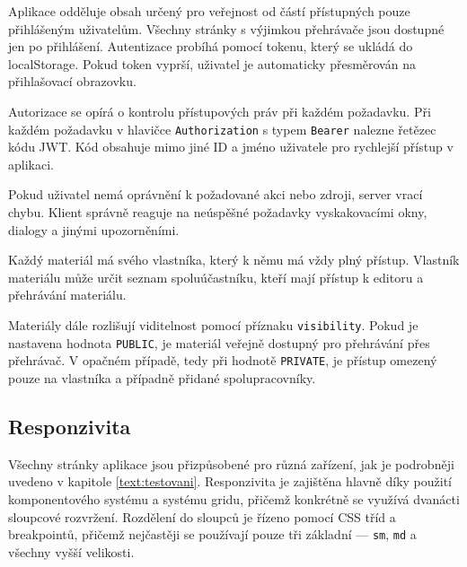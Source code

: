 Aplikace odděluje obsah určený pro veřejnost od částí přístupných pouze přihlášeným uživatelům. 
Všechny stránky s výjimkou přehrávače jsou dostupné jen po přihlášení. 
Autentizace probíhá pomocí tokenu, který se ukládá do localStorage. 
Pokud token vyprší, uživatel je automaticky přesměrován na přihlašovací obrazovku.

Autorizace se opírá o kontrolu přístupových práv při každém požadavku. 
Při každém požadavku v hlavičce \texttt{Authorization} s typem \texttt{Bearer} nalezne řetězec kódu JWT.
Kód obsahuje mimo jiné ID a jméno uživatele pro rychlejší přístup v aplikaci.

Pokud uživatel nemá oprávnění k požadované akci nebo zdroji, server vrací chybu. 
Klient správně reaguje na neúspěšné požadavky vyskakovacími okny, dialogy a jinými upozorněními.

Každý materiál má svého vlastníka, který k němu má vždy plný přístup. 
Vlastník materiálu může určit seznam spoluúčastníku, kteří mají přístup k editoru a přehrávání materiálu.

Materiály dále rozlišují viditelnost pomocí příznaku \texttt{visibility}. 
Pokud je nastavena hodnota \texttt{PUBLIC}, je materiál veřejně dostupný pro přehrávání přes přehrávač. 
V opačném případě, tedy při hodnotě \texttt{PRIVATE}, je přístup omezený pouze na vlastníka a případně přidané spolupracovníky.





\subsection{Responzivita}\label{text:realizace/responzivita}


Všechny stránky aplikace jsou přizpůsobené pro různá zařízení, jak je podrobněji uvedeno v kapitole \ref{text:testovani}. 
Responzivita je zajištěna hlavně díky použití komponentového systému a systému gridu, přičemž konkrétně se využívá dvanácti sloupcové rozvržení. 
Rozdělení do sloupců je řízeno pomocí CSS tříd a breakpointů, přičemž nejčastěji se používají pouze tři základní — \texttt{sm}, \texttt{md} a všechny vyšší velikosti.

